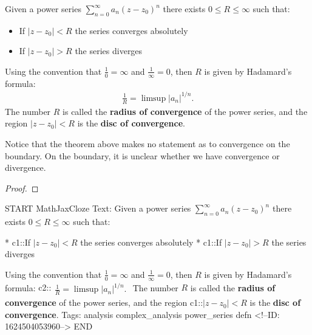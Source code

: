 \documentclass{memoir}
\begin{document}
\begin{thm}
	Given a power series \(\sum_{n=0}^{\infty} a_n (z-z_0)^{n}\) there exists \(0\leq R\leq \infty\) such that:
	\begin{itemize}
		\item If \(\left| z-z_0 \right| <R\) the series converges absolutely
		\item If \(\left| z -z_0\right| >R\) the series diverges
	\end{itemize}
	Using the convention that \(\frac{1}{0}= \infty\) and \(\frac{1}{\infty}=0\), then \(R\) is given by Hadamard's formula:
	\begin{align*}
		\frac{1}{R}= \limsup \left| a_n \right|^{1 / n} .
	\end{align*}
	The number \(R\) is called the \textbf{radius of convergence} of the power series, and the region \(\left| z-z_0 \right| <R\) is the \textbf{disc of convergence}.
\end{thm}

Notice that the theorem above makes no statement as to convergence on the boundary. On the boundary, it is unclear whether we have convergence or divergence.

\begin{proof}
	
\end{proof}

\begin{anki}
START
MathJaxCloze
Text: Given a power series \(\sum_{n=0}^{\infty} a_n (z-z_0)^{n}\) there exists \(0\leq R\leq \infty\) such that:

* {{c1::If \(\left| z-z_0 \right| <R\) the series converges absolutely}}
* {{c1::If \(\left| z -z_0\right| >R\) the series diverges}}

Using the convention that \(\frac{1}{0}= \infty\) and \(\frac{1}{\infty}=0\), then \(R\) is given by Hadamard's formula:
 {{c2::\(\begin{align*}
        	\frac{1}{R}= \limsup \left| a_n \right|^{1 / n} .
        \end{align*}\)}} 
	The number \(R\) is called the \textbf{radius of convergence} of the power series, and the region {{c1::\(\left| z-z_0 \right| <R\)}}  is the \textbf{disc of convergence}.
Tags: analysis complex_analysis power_series defn
<!--ID: 1624504053960-->
END
\end{anki}
\end{document}
